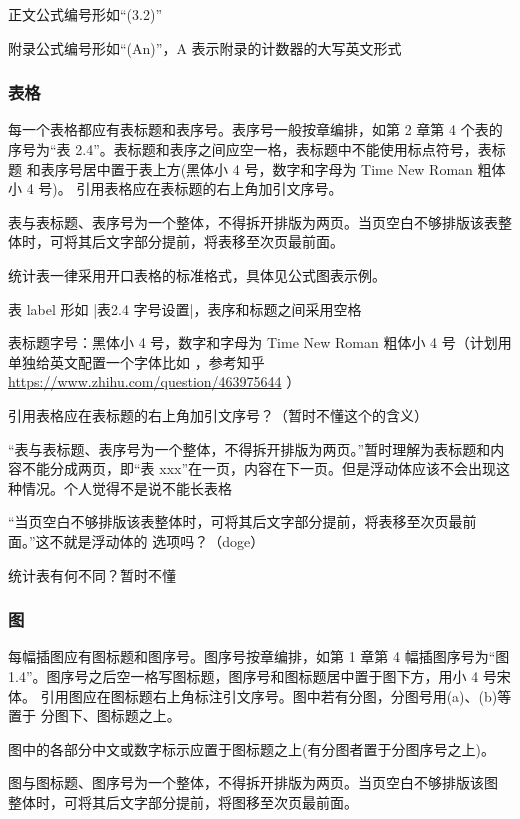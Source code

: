 \begin{points}
  \item 正文公式编号形如“(3.2)”
  \item 附录公式编号形如“(An)”，A 表示附录的计数器的大写英文形式
\end{points}


\subsubsection{表格}

\begin{reference}
  每一个表格都应有表标题和表序号。表序号一般按章编排，如第 2 章第 4 个表的 序号为“表 2.4”。表标题和表序之间应空一格，表标题中不能使用标点符号，表标题 和表序号居中置于表上方(黑体小 4 号，数字和字母为 Time New Roman 粗体小 4 号)。 引用表格应在表标题的右上角加引文序号。
  
  表与表标题、表序号为一个整体，不得拆开排版为两页。当页空白不够排版该表整体时，可将其后文字部分提前，将表移至次页最前面。

  统计表一律采用开口表格的标准格式，具体见公式图表示例。
\end{reference}

\begin{points}
  \item 表 label 形如 |表2.4 字号设置|，表序和标题之间采用空格
  \item 表标题字号：黑体小 4 号，数字和字母为 Time New Roman 粗体小 4 号（计划用  单独给英文配置一个字体比如 ，参考知乎 \url{https://www.zhihu.com/question/463975644} ）
  \item 引用表格应在表标题的右上角加引文序号？（暂时不懂这个的含义）
  \item “表与表标题、表序号为一个整体，不得拆开排版为两页。”暂时理解为表标题和内容不能分成两页，即“表 xxx”在一页，内容在下一页。但是浮动体应该不会出现这种情况。个人觉得不是说不能长表格
  \item “当页空白不够排版该表整体时，可将其后文字部分提前，将表移至次页最前面。”这不就是浮动体的  选项吗？（doge）
  \item 统计表有何不同？暂时不懂
\end{points}


\subsubsection{图}

\begin{reference}
  每幅插图应有图标题和图序号。图序号按章编排，如第 1 章第 4 幅插图序号为“图1.4”。图序号之后空一格写图标题，图序号和图标题居中置于图下方，用小 4 号宋体。 引用图应在图标题右上角标注引文序号。图中若有分图，分图号用(a)、(b)等置于 分图下、图标题之上。

  图中的各部分中文或数字标示应置于图标题之上(有分图者置于分图序号之上)。

  图与图标题、图序号为一个整体，不得拆开排版为两页。当页空白不够排版该图 整体时，可将其后文字部分提前，将图移至次页最前面。
\end{reference}

